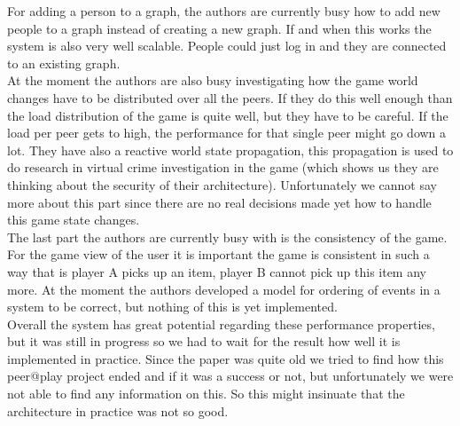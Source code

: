 For adding a person to a graph, the authors are currently busy how to add new people to a graph instead of creating a new graph. 
If and when this works the system is also very well scalable. 
People could just log in and they are connected to an existing graph.\\
\indent At the moment the authors are also busy investigating how the game world changes have to be distributed over all the peers. 
If they do this well enough than the load distribution of the game is quite well, but they have to be careful. 
If the load per peer gets to high, the performance for that single peer might go down a lot. 
They have also a reactive world state propagation, this propagation is used to do research in virtual crime investigation in the game (which shows us they are thinking about the security of their architecture).
Unfortunately we cannot say more about this part since there are no real decisions made yet how to handle this game state changes.\\
\indent The last part the authors are currently busy with is the consistency of the game. 
For the game view of the user it is important the game is consistent in such a way that is player A picks up an item, player B cannot pick up this item any more. 
At the moment the authors developed a model for ordering of events in a system to be correct, but nothing of this is yet implemented. \\
\indent Overall the system has great potential regarding these performance properties, but it was still in progress so we had to wait for the result how well it is implemented in practice. 
Since the paper was quite old we tried to find how this peer@play project ended and if it was a success or not, but unfortunately we were not able to find any information on this. 
So this might insinuate that the architecture in practice was not so good.
